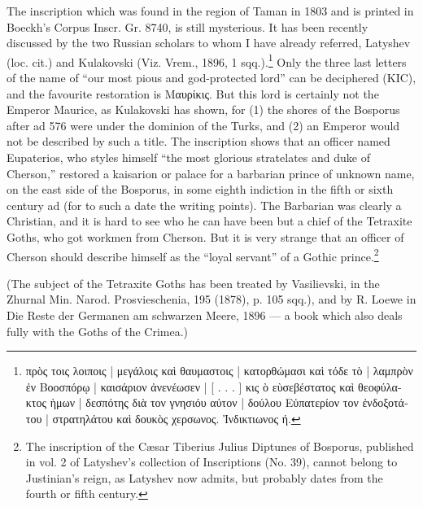 The inscription which was found in the region of Taman in 1803 and is printed in Boeckh\texthebrew{}’s Corpus Inscr. Gr. 8740, is still mysterious. It has been recently discussed by the two Russian scholars to whom I have already referred, Latyshev (loc. cit.) and Kulakovski (Viz. Vrem., 1896, 1 sqq.).\footnote{\textgreek{πρ\texthebrew{ὸ}ς τοις λοιποις} | \textgreek{μεγάλοις κα\texthebrew{ὶ} θαυμαστοις} | \textgreek{κατορθώμασι κα\texthebrew{ὶ} τόδε τ\texthebrew{ὸ}} | \textgreek{λαμπρ\texthebrew{ὸ}ν \texthebrew{ἐ}ν Βοοσπόρ\texthebrew{ῳ}} | \textgreek{καισάριον \texthebrew{ἀ}νενέωσεν} | [ . . . ] \textgreek{κις \texthebrew{ὸ} ε\texthebrew{ὺ}σεβέστατος κα\texthebrew{ὶ} θεοφύλακτος \texthebrew{ὴ}μων} | \textgreek{δεσπότης δι\texthebrew{ὰ} τον γνησιόυ α\texthebrew{ὐ}τον} | \textgreek{δούλου Ε\texthebrew{ὐ}πατερίον τον \texthebrew{ἐ}νδοξοτάτου} | \textgreek{στρατηλάτου κα\texthebrew{ὶ} δουκ\texthebrew{ὸ}ς χερσωνος. \texthebrew{Ἰ}νδικτιωνος ή}.} Only the three last letters of the name of \texthebrew{“}our most pious and god-protected lord\texthebrew{}” can be deciphered (KIC), and the favourite restoration is \textgreek{Μαυρίκις}. But this lord is certainly not the Emperor Maurice, as Kulakovski has shown, for (1) the shores of the Bosporus after ad 576 were under the dominion of the Turks, and (2) an Emperor would not be described by such a title. The inscription shows that an officer named Eupaterios, who styles himself \texthebrew{“}the most glorious stratelates and duke of Cherson,\texthebrew{}” restored a kaisarion or palace for a barbarian prince of unknown name, on the east side of the Bosporus, in some eighth indiction in the fifth or sixth century ad (for to such a date the writing points). The Barbarian was clearly a Christian, and it is hard to see who he can have been but a chief of the Tetraxite Goths, who got workmen from Cherson. But it is very strange that an officer of Cherson should describe himself as the \texthebrew{“}loyal servant\texthebrew{}” of a Gothic prince.\footnote{The inscription of the Cæsar Tiberius Julius Diptunes of Bosporus, published in vol. 2 of Latyshev\texthebrew{}’s collection of Inscriptions (No. 39), cannot belong to Justinian\texthebrew{}’s reign, as Latyshev now admits, but probably dates from the fourth or fifth century.}

(The subject of the Tetraxite Goths has been treated by Vasilievski, in the Zhurnal Min. Narod. Prosvieschenia, 195 (1878), p. 105 sqq.), and by R. Loewe in Die Reste der Germanen am schwarzen Meere, 1896 \texthebrew{—} a book which also deals fully with the Goths of the Crimea.)


